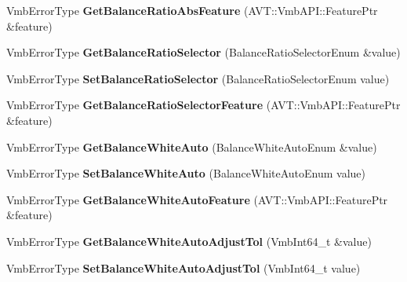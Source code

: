 \begin{DoxyCompactItemize}
\item 
\hypertarget{classMakoCamera_af10d6f19b276bd766a6609e59579706f}{Vmb\-Error\-Type {\bfseries Get\-Balance\-Ratio\-Abs\-Feature} (A\-V\-T\-::\-Vmb\-A\-P\-I\-::\-Feature\-Ptr \&feature)}\label{classMakoCamera_af10d6f19b276bd766a6609e59579706f}

\item 
\hypertarget{classMakoCamera_ab3f53c5cb9d54558f6ace088ad185716}{Vmb\-Error\-Type {\bfseries Get\-Balance\-Ratio\-Selector} (Balance\-Ratio\-Selector\-Enum \&value)}\label{classMakoCamera_ab3f53c5cb9d54558f6ace088ad185716}

\item 
\hypertarget{classMakoCamera_adb5bde628b4e570e74d79d7cfd161291}{Vmb\-Error\-Type {\bfseries Set\-Balance\-Ratio\-Selector} (Balance\-Ratio\-Selector\-Enum value)}\label{classMakoCamera_adb5bde628b4e570e74d79d7cfd161291}

\item 
\hypertarget{classMakoCamera_aa54bcf730a9db6d7697137a8d5b49caa}{Vmb\-Error\-Type {\bfseries Get\-Balance\-Ratio\-Selector\-Feature} (A\-V\-T\-::\-Vmb\-A\-P\-I\-::\-Feature\-Ptr \&feature)}\label{classMakoCamera_aa54bcf730a9db6d7697137a8d5b49caa}

\item 
\hypertarget{classMakoCamera_a6aa0f436633043266be2eb9a8802410e}{Vmb\-Error\-Type {\bfseries Get\-Balance\-White\-Auto} (Balance\-White\-Auto\-Enum \&value)}\label{classMakoCamera_a6aa0f436633043266be2eb9a8802410e}

\item 
\hypertarget{classMakoCamera_a41532cf7547e02f184577531bd0ef70f}{Vmb\-Error\-Type {\bfseries Set\-Balance\-White\-Auto} (Balance\-White\-Auto\-Enum value)}\label{classMakoCamera_a41532cf7547e02f184577531bd0ef70f}

\item 
\hypertarget{classMakoCamera_adcf6fd8783f51a4dbb7749616e90a9ce}{Vmb\-Error\-Type {\bfseries Get\-Balance\-White\-Auto\-Feature} (A\-V\-T\-::\-Vmb\-A\-P\-I\-::\-Feature\-Ptr \&feature)}\label{classMakoCamera_adcf6fd8783f51a4dbb7749616e90a9ce}

\item 
\hypertarget{classMakoCamera_a732754acc7e17f9ba8fae3c3f4d264ef}{Vmb\-Error\-Type {\bfseries Get\-Balance\-White\-Auto\-Adjust\-Tol} (Vmb\-Int64\-\_\-t \&value)}\label{classMakoCamera_a732754acc7e17f9ba8fae3c3f4d264ef}

\item 
\hypertarget{classMakoCamera_a4f80fd3210a4659902d3d159fc174563}{Vmb\-Error\-Type {\bfseries Set\-Balance\-White\-Auto\-Adjust\-Tol} (Vmb\-Int64\-\_\-t value)}\label{classMakoCamera_a4f80fd3210a4659902d3d159fc174563}


\end{DoxyCompactItemize}
